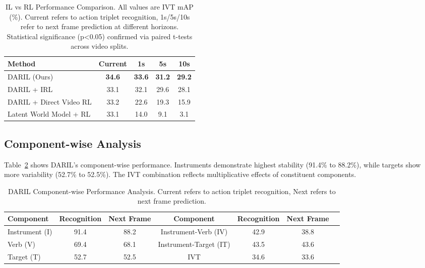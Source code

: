 \documentclass[runningheads]{llncs}
\begin{document}
\begin{table}[h]
\centering
\caption{IL vs RL Performance Comparison. All values are IVT mAP (\%). Current refers to action triplet recognition, 1s/5s/10s refer to next frame prediction at different horizons. Statistical significance (p<0.05) confirmed via paired t-tests across video splits.}
\label{tab:main_results}
\begin{tabular}{lcccc}
\toprule
\textbf{Method} & \textbf{Current} & \textbf{1s} & \textbf{5s} & \textbf{10s} \\
\midrule
DARIL (Ours) & \textbf{34.6} & \textbf{33.6} & \textbf{31.2} & \textbf{29.2} \\
DARIL + IRL & 33.1 & 32.1 & 29.6 & 28.1 \\
DARIL + Direct Video RL & 33.2 & 22.6 & 19.3 & 15.9 \\
Latent World Model + RL & 33.1 & 14.0 & 9.1 & 3.1 \\
\bottomrule
\end{tabular}
\end{table}

\subsection{Component-wise Analysis}

Table~\ref{tab:component_analysis} shows DARIL's component-wise performance. Instruments demonstrate highest stability (91.4\% to 88.2\%), while targets show more variability (52.7\% to 52.5\%). The IVT combination reflects multiplicative effects of constituent components.

\begin{table}[h]
\centering
\caption{DARIL Component-wise Performance Analysis. Current refers to action triplet recognition, Next refers to next frame prediction.}
\label{tab:component_analysis}
\begin{tabular}{lcccccc}
\toprule
\textbf{Component} & \textbf{Recognition} & \textbf{Next Frame} & \textbf{Component} & \textbf{Recognition} & \textbf{Next Frame} \\
\midrule
Instrument (I) & 91.4 & 88.2 & Instrument-Verb (IV) & 42.9 & 38.8 \\
Verb (V) & 69.4 & 68.1 & Instrument-Target (IT) & 43.5 & 43.6 \\
Target (T) & 52.7 & 52.5 & IVT & 34.6 & 33.6 \\
\bottomrule
\end{tabular}
\end{table}
\end{document}
